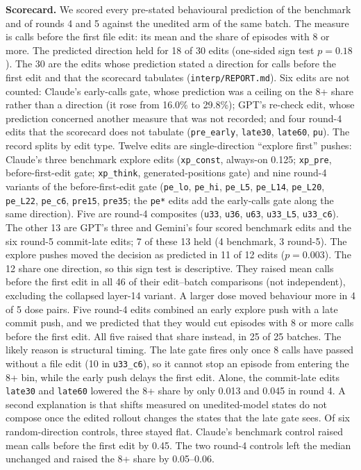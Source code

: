 \textbf{Scorecard.} We scored every pre-stated behavioural prediction of the benchmark and of rounds 4 and 5 against the unedited arm of the same batch. The measure is calls before the first file edit: its mean and the share of episodes with 8 or more. The predicted direction held for 18 of 30 edits (one-sided sign test $p = 0.18$). The 30 are the edits whose prediction stated a direction for calls before the first edit and that the scorecard tabulates (\texttt{interp/REPORT.md}). Six edits are not counted: Claude's early-calls gate, whose prediction was a ceiling on the 8+ share rather than a direction (it rose from 16.0\% to 29.8\%); GPT's re-check edit, whose prediction concerned another measure that was not recorded; and four round-4 edits that the scorecard does not tabulate (\texttt{pre\_early}, \texttt{late30}, \texttt{late60}, \texttt{pu}). The record splits by edit type. Twelve edits are single-direction ``explore first'' pushes: Claude's three benchmark explore edits (\texttt{xp\_const}, always-on 0.125; \texttt{xp\_pre}, before-first-edit gate; \texttt{xp\_think}, generated-positions gate) and nine round-4 variants of the before-first-edit gate (\texttt{pe\_lo}, \texttt{pe\_hi}, \texttt{pe\_L5}, \texttt{pe\_L14}, \texttt{pe\_L20}, \texttt{pe\_L22}, \texttt{pe\_c6}, \texttt{pre15}, \texttt{pre35}; the \texttt{pe*} edits add the early-calls gate along the same direction). Five are round-4 composites (\texttt{u33}, \texttt{u36}, \texttt{u63}, \texttt{u33\_L5}, \texttt{u33\_c6}). The other 13 are GPT's three and Gemini's four scored benchmark edits and the six round-5 commit-late edits; 7 of these 13 held (4 benchmark, 3 round-5). The explore pushes moved the decision as predicted in 11 of 12 edits ($p = 0.003$). The 12 share one direction, so this sign test is descriptive. They raised mean calls before the first edit in all 46 of their edit--batch comparisons (not independent), excluding the collapsed layer-14 variant. A larger dose moved behaviour more in 4 of 5 dose pairs. Five round-4 edits combined an early explore push with a late commit push, and we predicted that they would cut episodes with 8 or more calls before the first edit. All five raised that share instead, in 25 of 25 batches. The likely reason is structural timing. The late gate fires only once 8 calls have passed without a file edit (10 in \texttt{u33\_c6}), so it cannot stop an episode from entering the 8+ bin, while the early push delays the first edit. Alone, the commit-late edits \texttt{late30} and \texttt{late60} lowered the 8+ share by only 0.013 and 0.045 in round 4. A second explanation is that shifts measured on unedited-model states do not compose once the edited rollout changes the states that the late gate sees. Of six random-direction controls, three stayed flat. Claude's benchmark control raised mean calls before the first edit by 0.45. The two round-4 controls left the median unchanged and raised the 8+ share by 0.05--0.06.

